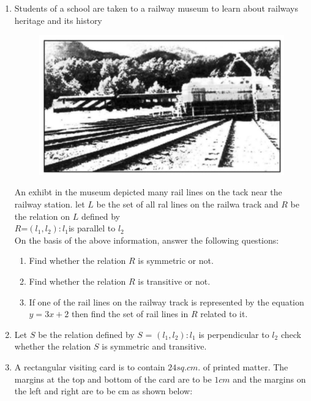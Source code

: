 \documentclass{article}
\begin{document}
\begin{enumerate}
\item Students of a school are taken to a railway museum to learn about railways heritage and its history\\
	\begin{figure}[h!]
		\centering
		\includegraphics[width=\columnwidth]{images/fig1.jpg}
		\label{fig:image1}
	\end{figure}
	An exhibt in the museum depicted many rail lines on the tack near the railway station. let $L$ be the set of all ral lines on the railwa track and $R$ be the relation on $L$ defined by\\
		$R$={$(l_{1},l_{2}):l_{1} $is parallel to $l_{2}$}\\
	On the basis of the above information, answer the following questions:
\begin{enumerate}
\item Find whether the relation $R$ is symmetric or not.

\item Find whether the relation $R$ is transitive or not.

\item If one of the rail lines on the railway track is represented by the equation $y = 3x + 2$ then find the set of rail lines in $R$ related to it.

\end{enumerate}
\item Let $S$ be the relation defined by $S$ = {$( l_{1},l_{2}):l_{1}$ is perpendicular to $l_{2}$} check whether the relation $S$ is symmetric and transitive.

\item A rectangular visiting card is to contain $24 sq.cm.$ of printed matter. The margins at the top and bottom of the card are to be $1 cm$ and the margins on the left and right are to be cm as shown below:


\end{enumerate}
\end{document}
